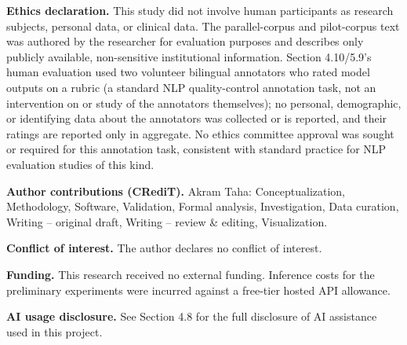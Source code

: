 \textbf{Ethics declaration.} This study did not involve human participants as research subjects, personal data, or clinical data. The parallel-corpus and pilot-corpus text was authored by the researcher for evaluation purposes and describes only publicly available, non-sensitive institutional information. Section 4.10/5.9's human evaluation used two volunteer bilingual annotators who rated model outputs on a rubric (a standard NLP quality-control annotation task, not an intervention on or study of the annotators themselves); no personal, demographic, or identifying data about the annotators was collected or is reported, and their ratings are reported only in aggregate. No ethics committee approval was sought or required for this annotation task, consistent with standard practice for NLP evaluation studies of this kind.

\textbf{Author contributions (CRediT).} Akram Taha: Conceptualization, Methodology, Software, Validation, Formal analysis, Investigation, Data curation, Writing -- original draft, Writing -- review \& editing, Visualization.

\textbf{Conflict of interest.} The author declares no conflict of interest.

\textbf{Funding.} This research received no external funding. Inference costs for the preliminary experiments were incurred against a free-tier hosted API allowance.

\textbf{AI usage disclosure.} See Section 4.8 for the full disclosure of AI assistance used in this project.



